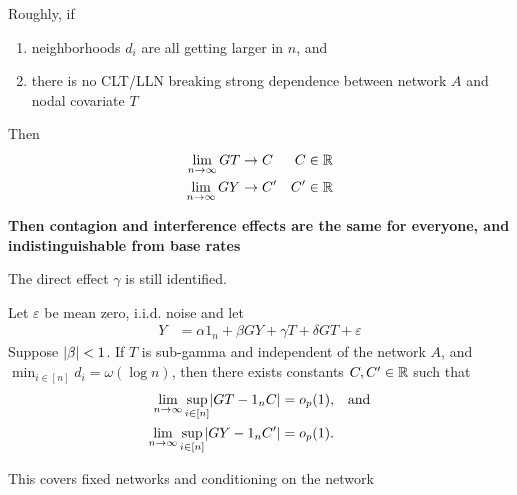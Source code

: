 \documentclass[aspectratio=169]{beamer}
\theoremstyle{remark}
\begin{document}
\begin{frame}
    Roughly, if
    \begin{enumerate}
        \item neighborhoods $d_i$ are all getting larger in $n$, and
        \item there is no CLT/LLN breaking strong dependence between network $A$ and nodal covariate $T$
    \end{enumerate}
    Then 
    \begin{align*}
        \lim_{n \to \infty} GT & \to C  & C \in \mathbb{R}   \\
        \lim_{n \to \infty} GY & \to C' & C' \in \mathbb{R}
    \end{align*}
    
    \textbf{Then contagion and interference effects are the same for everyone, and indistinguishable from base rates}
    
    The direct effect $\gamma$ is still identified.
\end{frame}

\begin{frame}
    \begin{theorem}
        Let $\varepsilon$ be mean zero, i.i.d. noise and let
        \begin{align*}
            Y & = \alpha 1_n + \beta G Y + \gamma T + \delta G T + \varepsilon                        
        \end{align*}
        Suppose $\lvert\beta\rvert < 1$. If $T$ is sub-gamma and independent of the network $A$, and $\min_{i \in [n]} d_i = \omega(\log n)$, then there exists constants $C, C' \in \mathbb{R}$ such that
        \begin{align*}
            \lim_{n \to \infty} \sup_{i \in [n]} \abs*{GT - 1_n C}  & = \op{1},  & \text{and} \\
            \lim_{n \to \infty} \sup_{i \in [n]} \abs*{GY - 1_n C'} & = \op{1}.
        \end{align*}
    \end{theorem}
    
    \footnotesize * This covers fixed networks and conditioning on the network
\end{frame}
\end{document}
